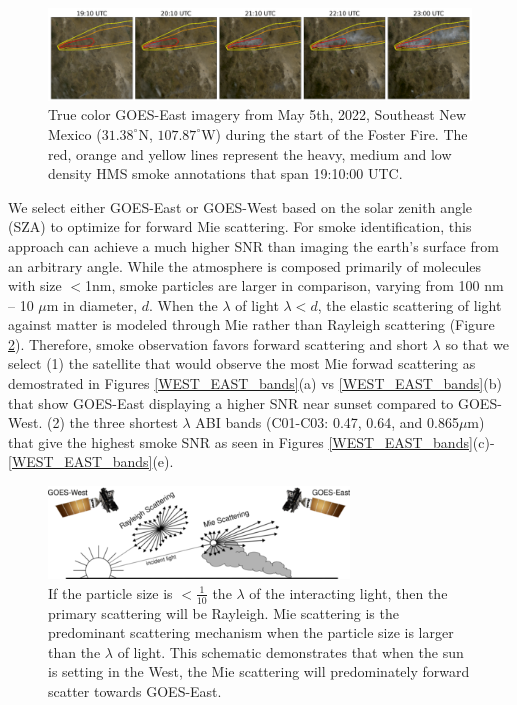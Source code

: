 \documentclass{article}
\begin{document}
\begin{figure}[!htb]
    \centering
    \includegraphics[width=\linewidth]{figures/timelapse_small.png}
    \caption{True color GOES-East imagery from May 5th, 2022, Southeast New Mexico (\(31.38^{\circ}\)N, \(107.87^{\circ}\)W) during the start of the Foster Fire. The red, orange and yellow lines represent the heavy, medium and low density HMS smoke annotations that span 19:10:00 UTC.}
    \label{timelapse}
\end{figure}


We select either GOES-East or GOES-West based on the solar zenith angle (SZA) to optimize for forward Mie scattering. For smoke identification, this approach can achieve a much higher SNR than imaging the earth’s surface from an arbitrary angle. While the atmosphere is composed primarily of molecules with size \(<\)1nm, smoke particles are larger in comparison, varying from 100 nm -- 10 \(\mu\)m in diameter, \(d\). When the \(\lambda\) of light \(\lambda<d\), the elastic scattering of light against matter is modeled through Mie rather than Rayleigh scattering (Figure \ref{mei}). Therefore, smoke observation favors forward scattering and short \(\lambda\) so that we select (1) the satellite that would observe the most Mie forwad scattering as demostrated in Figures \ref{WEST_EAST_bands}(a) vs \ref{WEST_EAST_bands}(b) that show GOES-East displaying a higher SNR near sunset compared to GOES-West. (2) the three shortest \(\lambda\) ABI bands (C01-C03: 0.47, 0.64, and 0.865\(\mu\)m) that give the highest smoke SNR as seen in Figures \ref{WEST_EAST_bands}(c)-\ref{WEST_EAST_bands}(e).


\begin{figure}[!htb]
    \centering
    \includegraphics[width=8cm]{figures/mei_small.png}
    \caption{If the particle size is \(<\frac{1}{10}\) the \(\lambda\) of the interacting light, then the primary scattering will be Rayleigh. Mie scattering is the predominant scattering mechanism when the particle size is larger than the \(\lambda\) of light. This schematic demonstrates that when the sun is setting in the West, the Mie scattering will predominately forward scatter towards GOES-East.} \label{mei}
\end{figure}
\end{document}

